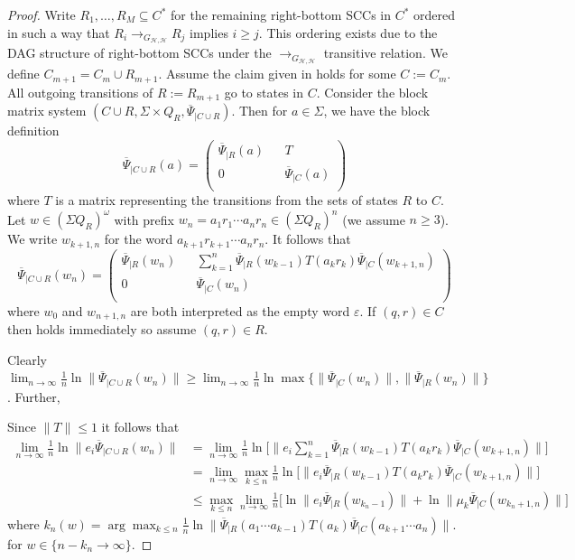 \documentclass[a4paper,UKenglish,cleveref, autoref,mathscr]{lipics-v2019}
\newcommand{\1}{\mathbbm{1}}
\renewcommand{\epsilon}{\varepsilon}
\begin{document}
\begin{proof}
Write $R_1, \dots, R_M \subseteq C^*$ for the remaining right-bottom SCCs in $C^*$ ordered in such a way that $R_i \rightarrow_{G_{\mathcal{H}, \mathcal{H}}} R_j$ implies $i \geq j$. This ordering exists due to the DAG structure of right-bottom SCCs under the $\rightarrow_{G_{\mathcal{H}, \mathcal{H}}}$ transitive relation. We define $C_{m+1} = C_m \cup R_{m+1}$. Assume the claim given in  holds for some $C := C_m$. All outgoing transitions of $R := R_{m+1}$ go to states in $C$. Consider the block matrix system $(C \cup R, \Sigma \times Q_R, \overline{\Psi}_{|C \cup R})$. Then for $a \in \Sigma$, we have the block definition 
\begin{equation*}
\overline{\Psi}_{|C \cup R}(a) = \begin{pmatrix}
\overline{\Psi}_{|R}(a) && T\\
0 && \overline{\Psi}_{|C}(a) \\
\end{pmatrix}
\end{equation*}
where $T$ is a matrix representing the transitions from the sets of states $R$ to $C$. Let $w \in (\Sigma Q_R)^\omega$ with prefix $w_n = a_1 r_1 \cdots a_n r_n \in (\Sigma Q_R)^n$ (we assume $n \geq 3$). We write $w_{k+1, n}$ for the word $a_{k+1} r_{k+1} \cdots a_n r_n$. It follows that
\begin{equation*}
\overline{\Psi}_{|C \cup R}(w_n) = \begin{pmatrix}
\overline{\Psi}_{|R}(w_n) && \sum_{k = 1}^{n}\overline{\Psi}_{|R}(w_{k-1}) T(a_k r_k) \overline{\Psi}_{|C}(w_{k+1, n})\\
0 && \overline{\Psi}_{|C}(w_n) \\
\end{pmatrix}
\end{equation*}
where $w_0$ and $w_{n+1, n}$ are both interpreted as the empty word $\epsilon$. If $(q, r) \in C$ then  holds immediately so assume $(q,r) \in R$.  

Clearly $\lim_{n \rightarrow \infty}\frac1n \ln \|\overline{\Psi}_{|C \cup R}(w_n)\| \geq \lim_{n \rightarrow \infty}\frac1n \ln \max \{ \|\overline{\Psi}_{|C}(w_n)\|, \|\overline{\Psi}_{|R}(w_n)\| \}$. Further, 


Since $\|T\| \leq 1$ it follows that 
\begin{align*}
\lim_{n \rightarrow \infty}\frac1n \ln \| e_i\overline{\Psi}_{|C \cup R}(w_n)\| & = \lim_{n \rightarrow \infty}\frac1n \ln \Big[ \|e_i \sum_{k = 1}^{n} \overline{\Psi}_{|R}(w_{k-1}) T(a_k r_k)\overline{\Psi}_{|C}(w_{k+1,n}) \|\Big] \\
& = \lim_{n \rightarrow \infty} \max_{k \leq n} \frac1n \ln \Big[ \| e_i \overline{\Psi}_{|R}(w_{k-1}) T(a_k r_k) \overline{\Psi}_{|C}(w_{k+1,n}) \|\Big] \\
& \leq \max_{k \leq n} \lim_{n \rightarrow \infty} \frac1n \Big[ \ln \| e_i \overline{\Psi}_{|R}(w_{k_n-1}) \| + \ln \| \mu_k \overline{\Psi}_{|C}(w_{k_n+1,n}) \|\Big]
\end{align*}
where $k_n(w) = \arg\max_{k \leq n} \frac1n \ln \| \overline{\Psi}_{|R}(a_1\cdots a_{k - 1}) T(a_k) \overline{\Psi}_{|C}(a_{k + 1} \cdots a_n) \|$. for $w \in \{n - k_n \rightarrow \infty\}$. 



\end{proof}
\end{document}
